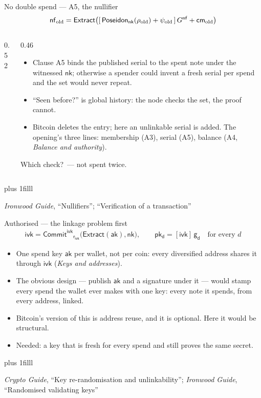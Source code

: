 \documentclass[aspectratio=169,11pt]{beamer}
\newcommand{\cmsym}{\ensuremath{\mathsf{cm}}}
\newcommand{\gd}{\ensuremath{\mathsf{g_d}}}
\newcommand{\pkd}{\ensuremath{\mathsf{pk_d}}}
\newcommand{\aksym}{\ensuremath{\mathsf{ak}}}
\newcommand{\nksym}{\ensuremath{\mathsf{nk}}}
\newcommand{\ivk}{\ensuremath{\mathsf{ivk}}}
\newcommand{\rivk}{\ensuremath{\mathsf{r_{ivk}}}}
\newcommand{\Extract}{\ensuremath{\mathsf{Extract}}}
\newcommand{\CommitIvk}{\ensuremath{\mathsf{Commit}^{\mathsf{ivk}}}}
\newcommand{\src}[1]{\par\vskip0pt plus 1filll
  {\fontsize{6}{7.2}\selectfont\color{arbdim}\raggedright #1\par}}
\begin{document}
\begin{frame}{No double spend --- A5, the nullifier}
\vspace{-6pt}
\[
\Enf = \Extract\bigl([\,\EPoseidon_{\nksym}(\Eold{\rho}) +
  \Eold{\psi}\,]\,\Egnf + \Eold{\cmsym}\bigr)
\]
\vspace{-10pt}
\begin{columns}[T]
\begin{column}{0.52\textwidth}
\centering\ActionBox[nf]
\end{column}
\begin{column}{0.46\textwidth}
\begin{itemize}\small\setlength{\itemsep}{0pt}
  \item Clause A5 binds the published serial to the spent note under
    the witnessed $\nksym$; otherwise a spender could invent a fresh
    serial per spend and the set would never repeat.
  \item ``Seen before?'' is global history: the node checks the set,
    the proof cannot.
  \item Bitcoin deletes the entry; here an unlinkable serial is added.
    The opening's three lines: membership (A3), serial (A5), balance
    (A4, \emph{Balance and authority}).
\end{itemize}
\vspace{-2pt}
\alert{Which check?}\pause\ --- not spent twice.
\end{column}
\end{columns}
\src{\emph{Ironwood Guide}, ``Nullifiers''; ``Verification of a transaction''}
\end{frame}

\begin{frame}{Authorised --- the linkage problem first}
\begin{gather*}
\ivk = \CommitIvk_{\rivk}\bigl(\Extract(\aksym), \nksym\bigr), \qquad
\pkd = [\ivk]\,\gd \quad\text{for every } d
\end{gather*}
\begin{itemize}
  \item One spend key $\aksym$ per wallet, not per coin: every
    diversified address shares it through $\ivk$ (\emph{Keys and
    addresses}).
  \item The obvious design --- publish $\aksym$ and a signature under
    it --- would stamp every spend the wallet ever makes with one key:
    every note it spends, from every address, linked.
  \item Bitcoin's version of this is address reuse, and it is
    optional. Here it would be structural.
  \item Needed: a key that is fresh for every spend and still proves
    the same secret.
\end{itemize}
\src{\emph{Crypto Guide}, ``Key re-randomisation and unlinkability'';
\emph{Ironwood Guide}, ``Randomised validating keys''}
\end{frame}
\end{document}
